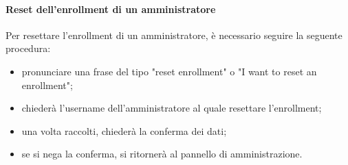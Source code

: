 \paragraph{Reset dell'enrollment di un amministratore}

Per resettare l'enrollment di un amministratore, è necessario seguire la seguente procedura:
\begin{itemize}
	\item pronunciare una frase del tipo "reset enrollment" o "I want to reset an enrollment";
	\item \PROGETTO{} chiederà l'username dell'amministratore al quale resettare l'enrollment;
	\item una volta raccolti, \PROGETTO{} chiederà la conferma dei dati;
	\item se si nega la conferma, si ritornerà al pannello di amministrazione.
\end{itemize}